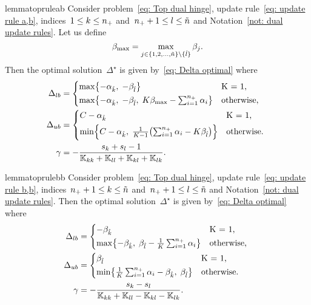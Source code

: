 \begin{restatable}{lemma}{topruleab}\label{thm: toppushk family hinge update a,b}
  Consider problem~\eqref{eq: Top dual hinge}, update rule~\eqref{eq: update rule a,b}, indices~$1 \leq k \leq n_{+}$ and~$n_{+} + 1 \leq l \leq \tilde{n}$ and Notation~\ref{not: dual update rules}. Let us define
  \begin{equation*}
    \beta_{\max} = \max_{j \in \{1, 2, \ldots, \tilde{n} \} \setminus \{\hat{l}\}} \beta_j.
  \end{equation*}
  Then the optimal solution~$\Delta^{\star}$ is given by~\eqref{eq: Delta optimal} where
  \begin{align*}
    \Delta_{lb} & = 
      \begin{cases*}
        \max \Brac[c]{- \alphak, \;  -\betal} & K = 1, \\
        \max \Brac[c]{- \alphak, \;  -\betal, \; K\beta_{\max} - \sum_{i = 1}^{\npos} \alpha_i} & \textrm{otherwise},
      \end{cases*} \\
    \Delta_{ub} & = 
      \begin{cases*}
          C - \alphak & K = 1, \\
          \min \Brac[c]{C - \alphak, \; \frac{1}{K-1}\Brac{\sum_{i = 1}^{\npos} \alpha_i - K \betal}}  & \textrm{otherwise}.
      \end{cases*} \\
    \gamma & = - \frac{s_k + s_l - 1}{\K_{kk} + \K_{ll} + \K_{kl} + \K_{lk}}.
  \end{align*}
\end{restatable}

\begin{restatable}{lemma}{toprulebb}\label{thm: toppushk family hinge update b,b}
  Consider problem~\eqref{eq: Top dual hinge}, update rule~\eqref{eq: update rule b,b}, indices~$n_{+} + 1 \leq k \leq \tilde{n}$ and~$n_{+} + 1 \leq l \leq \tilde{n}$ and Notation~\ref{not: dual update rules}. Then the optimal solution~$\Delta^{\star}$ is given by~\eqref{eq: Delta optimal} where
  \begin{align*}
    \Delta_{lb} & = 
      \begin{cases*}
        - \betak & K = 1, \\
        \max \Brac[c]{- \betak,\; \betal - \frac{1}{K} \sum_{i = 1}^{\npos} \alpha_i} & \textrm{otherwise},
      \end{cases*} \\
    \Delta_{ub} & = 
      \begin{cases*}
        \betal & K = 1, \\
        \min \Brac[c]{\frac{1}{K} \sum_{i = 1}^{\npos} \alpha_i - \betak,\; \betal} & \textrm{otherwise}.
      \end{cases*} \\
    \gamma & = -\frac{s_k - s_l}{\K_{kk} + \K_{ll} - \K_{kl} - \K_{lk}}.
  \end{align*}
\end{restatable}

